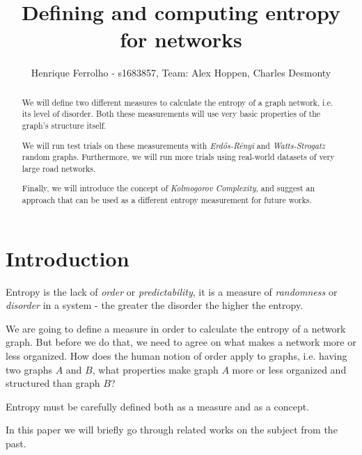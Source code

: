 \documentclass[journal]{IEEEtran}
\begin{document}
\title{Defining and computing entropy for networks}

\author{
Henrique Ferrolho - s1683857,
Team: Alex Hoppen, Charles Desmonty
}

\maketitle


\begin{abstract}

We will define two different measures to calculate the entropy of a graph network, i.e. its level of disorder. Both these measurements will use very basic properties of the graph's structure itself.

We will run test trials on these measurements with \textit{Erdős-Rényi} and \textit{Watts-Strogatz} random graphs. Furthermore, we will run more trials using real-world datasets of very large road networks.

Finally, we will introduce the concept of \textit{Kolmogorov Complexity}, and suggest an approach that can be used as a different entropy measurement for future works.

\end{abstract}


\section{Introduction}

Entropy is the lack of \textit{order} or \textit{predictability}, it is a measure of \textit{randomness} or \textit{disorder} in a system - the greater the disorder the higher the entropy.

We are going to define a measure in order to calculate the entropy of a network graph. But before we do that, we need to agree on what makes a network more or less organized. How does the human notion of order apply to graphs, i.e. having two graphs $A$ and $B$, what properties make graph $A$ more or less organized and structured than graph $B$?

Entropy must be carefully defined both as a measure and as a concept.

\bigskip

In this paper we will briefly go through related works on the subject from the past.
\end{document}
